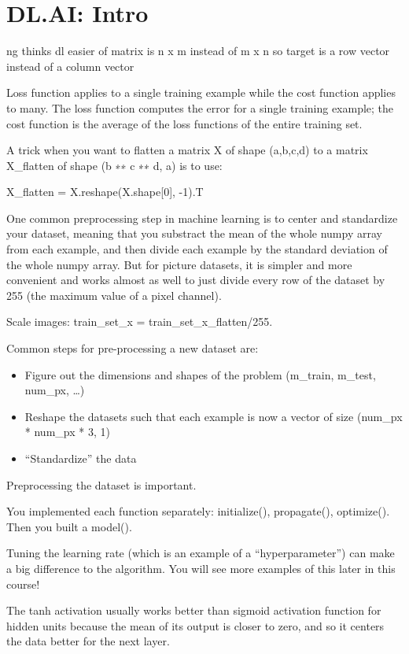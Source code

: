\documentclass[]{book}
\providecommand{\tightlist}{%
  \setlength{\itemsep}{0pt}\setlength{\parskip}{0pt}}
\begin{document}
\section{DL.AI: Intro}\label{dl.ai-intro}

ng thinks dl easier of matrix is n x m instead of m x n so target is a
row vector instead of a column vector

Loss function applies to a single training example while the cost
function applies to many. The loss function computes the error for a
single training example; the cost function is the average of the loss
functions of the entire training set.

A trick when you want to flatten a matrix X of shape (a,b,c,d) to a
matrix X\_flatten of shape (b ∗∗ c ∗∗ d, a) is to use:

X\_flatten = X.reshape(X.shape{[}0{]}, -1).T

One common preprocessing step in machine learning is to center and
standardize your dataset, meaning that you substract the mean of the
whole numpy array from each example, and then divide each example by the
standard deviation of the whole numpy array. But for picture datasets,
it is simpler and more convenient and works almost as well to just
divide every row of the dataset by 255 (the maximum value of a pixel
channel).

Scale images: train\_set\_x = train\_set\_x\_flatten/255.

Common steps for pre-processing a new dataset are:

\begin{itemize}
\tightlist
\item
  Figure out the dimensions and shapes of the problem (m\_train,
  m\_test, num\_px, \ldots{})
\item
  Reshape the datasets such that each example is now a vector of size
  (num\_px * num\_px * 3, 1)
\item
  ``Standardize'' the data
\end{itemize}

Preprocessing the dataset is important.

You implemented each function separately: initialize(), propagate(),
optimize(). Then you built a model().

Tuning the learning rate (which is an example of a ``hyperparameter'')
can make a big difference to the algorithm. You will see more examples
of this later in this course!

The tanh activation usually works better than sigmoid activation
function for hidden units because the mean of its output is closer to
zero, and so it centers the data better for the next layer.
\end{document}
